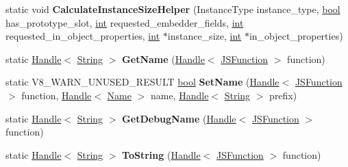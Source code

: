 \begin{DoxyCompactItemize}
\item 
\mbox{\label{classv8_1_1internal_1_1JSFunction_a077b4a46f50554b56f19c61c4b96ffed}} 
static void {\bfseries Calculate\+Instance\+Size\+Helper} (Instance\+Type instance\+\_\+type, \mbox{\hyperlink{classbool}{bool}} has\+\_\+prototype\+\_\+slot, \mbox{\hyperlink{classint}{int}} requested\+\_\+embedder\+\_\+fields, \mbox{\hyperlink{classint}{int}} requested\+\_\+in\+\_\+object\+\_\+properties, \mbox{\hyperlink{classint}{int}} $\ast$instance\+\_\+size, \mbox{\hyperlink{classint}{int}} $\ast$in\+\_\+object\+\_\+properties)
\item 
\mbox{\label{classv8_1_1internal_1_1JSFunction_a5dfff0e0bdaa9ce70b87bb72730da2b5}} 
static \mbox{\hyperlink{classv8_1_1internal_1_1Handle}{Handle}}$<$ \mbox{\hyperlink{classv8_1_1internal_1_1String}{String}} $>$ {\bfseries Get\+Name} (\mbox{\hyperlink{classv8_1_1internal_1_1Handle}{Handle}}$<$ \mbox{\hyperlink{classv8_1_1internal_1_1JSFunction}{J\+S\+Function}} $>$ function)
\item 
\mbox{\label{classv8_1_1internal_1_1JSFunction_a8c2a45a3c8212dda4dbe5146f6f4f921}} 
static V8\+\_\+\+W\+A\+R\+N\+\_\+\+U\+N\+U\+S\+E\+D\+\_\+\+R\+E\+S\+U\+LT \mbox{\hyperlink{classbool}{bool}} {\bfseries Set\+Name} (\mbox{\hyperlink{classv8_1_1internal_1_1Handle}{Handle}}$<$ \mbox{\hyperlink{classv8_1_1internal_1_1JSFunction}{J\+S\+Function}} $>$ function, \mbox{\hyperlink{classv8_1_1internal_1_1Handle}{Handle}}$<$ \mbox{\hyperlink{classv8_1_1internal_1_1Name}{Name}} $>$ name, \mbox{\hyperlink{classv8_1_1internal_1_1Handle}{Handle}}$<$ \mbox{\hyperlink{classv8_1_1internal_1_1String}{String}} $>$ prefix)
\item 
\mbox{\label{classv8_1_1internal_1_1JSFunction_af6db4cd1dfa7696d0fb765d0f45541d6}} 
static \mbox{\hyperlink{classv8_1_1internal_1_1Handle}{Handle}}$<$ \mbox{\hyperlink{classv8_1_1internal_1_1String}{String}} $>$ {\bfseries Get\+Debug\+Name} (\mbox{\hyperlink{classv8_1_1internal_1_1Handle}{Handle}}$<$ \mbox{\hyperlink{classv8_1_1internal_1_1JSFunction}{J\+S\+Function}} $>$ function)
\item 
\mbox{\label{classv8_1_1internal_1_1JSFunction_aaf8cacf5e4d7da65bf91bb3819f9043a}} 
static \mbox{\hyperlink{classv8_1_1internal_1_1Handle}{Handle}}$<$ \mbox{\hyperlink{classv8_1_1internal_1_1String}{String}} $>$ {\bfseries To\+String} (\mbox{\hyperlink{classv8_1_1internal_1_1Handle}{Handle}}$<$ \mbox{\hyperlink{classv8_1_1internal_1_1JSFunction}{J\+S\+Function}} $>$ function)
\end{DoxyCompactItemize}
